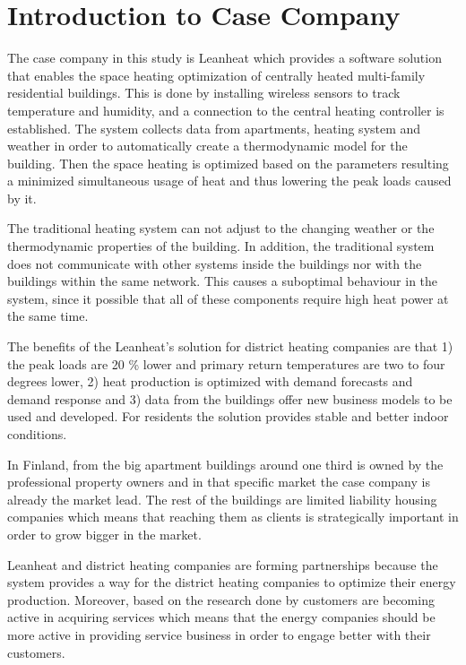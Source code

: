 \section{Introduction to Case Company}

The case company in this study is Leanheat which provides a software solution that enables the space  heating optimization of centrally heated multi-family residential buildings. This is done by installing wireless sensors to track temperature and humidity, and a connection to the central heating controller is established. The system collects data from apartments, heating system and weather in order to automatically create a thermodynamic model for the building. Then the space heating is optimized based on the parameters resulting a minimized simultaneous usage of heat and thus lowering the peak loads caused by it. \parencite{LenheatArticle:2019}

The traditional heating system can not adjust to the changing weather or the thermodynamic properties of the building. In addition, the traditional system does not communicate with other systems inside the buildings nor with the buildings within the same network. This causes a suboptimal behaviour in the system, since it possible that all of these components require high heat power at the same time. \parencite{LenheatArticle:2019}

The benefits of the Leanheat's solution for district heating companies are that 1) the peak loads are 20 \% lower and primary return temperatures are two to four degrees lower, 2) heat production is optimized with demand forecasts and demand response and 3) data from the buildings offer new business models to be used and developed. For residents the solution provides stable and better indoor conditions. \parencite{LenheatArticle:2019}

In Finland, from the big apartment buildings around one third is owned by the professional property owners and in that specific market the case company is already the market lead. The rest of the buildings are limited liability housing companies which means that reaching them as clients is strategically important in order to grow bigger in the market.

Leanheat and district heating companies are forming partnerships because the system provides a way for the district heating companies to optimize their energy production. Moreover, based on the research done by \textcite{Energyindustry:2019} customers are becoming active in acquiring services which means that the energy companies should be more active in providing service business in order to engage better with their customers.

